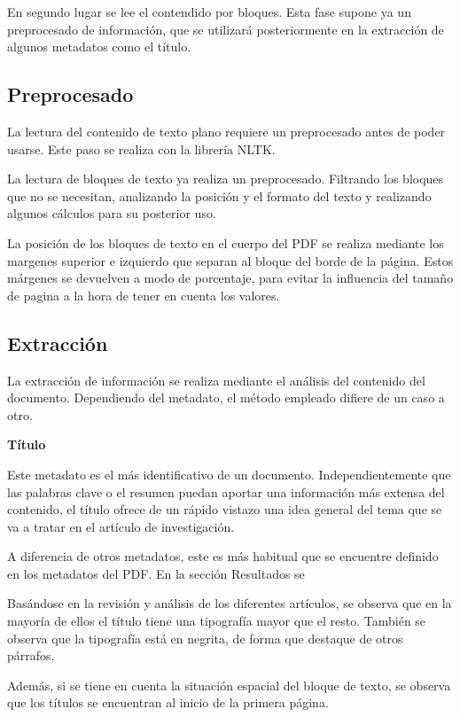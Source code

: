 \documentclass[../main.tex]{subfiles}
\begin{document}
En segundo lugar se lee el contendido por bloques. Esta fase supone ya un preprocesado de información, que se utilizará posteriormente en la extracción de algunos metadatos como el título.

\subsection{Preprocesado}

La lectura del contenido de texto plano requiere un preprocesado antes de poder usarse. Este paso se realiza con la librería NLTK.

La lectura de bloques de texto ya realiza un preprocesado. Filtrando los bloques que no se necesitan, analizando la posición y el formato del texto y realizando algunos cálculos para su posterior uso.

La posición de los bloques de texto en el cuerpo del PDF se realiza mediante los margenes superior e izquierdo que separan al bloque del borde de la página. Estos márgenes se devuelven a modo de porcentaje, para evitar la influencia del tamaño de pagina a la hora de tener en cuenta los valores.

\subsection{Extracción}

La extracción de información se realiza mediante el análisis del contenido del documento. Dependiendo del metadato, el método empleado difiere de un caso a otro.

\textbf{Título}

Este metadato es el más identificativo de un documento. Independientemente que las palabras clave o el resumen puedan aportar una información más extensa del contenido, el título ofrece de un rápido vistazo una idea general del tema que se va a tratar en el artículo de investigación.

A diferencia de otros metadatos, este es más habitual que se encuentre definido en los metadatos del PDF. En la sección Resultados se 

Basándose en la revisión y análisis de los diferentes artículos, se observa que en la mayoría de ellos el título tiene una tipografía mayor que el resto. También se observa que la tipografía está en negrita, de forma que destaque de otros párrafos.

Además, si se tiene en cuenta la situación espacial del bloque de texto, se observa que los títulos se encuentran al inicio de la primera página.
\end{document}
